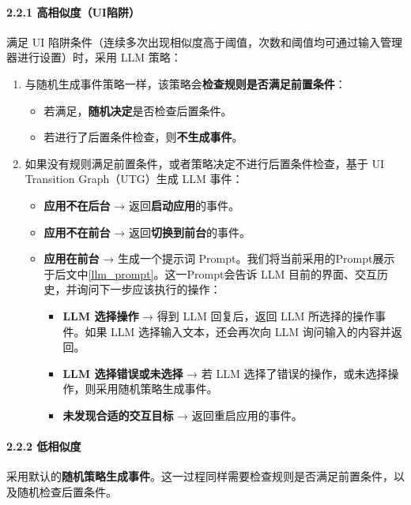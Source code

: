 \documentclass[UTF8, fontset=windows]{article}
\begin{document}
\paragraph{2.2.1 高相似度（UI陷阱）}
满足 UI 陷阱条件（连续多次出现相似度高于阈值，次数和阈值均可通过输入管理器进行设置）时，采用 LLM 策略：
\begin{enumerate}[leftmargin=2em]
    \item 与随机生成事件策略一样，该策略会\textbf{检查规则是否满足前置条件}：
    \begin{itemize}
        \item 若满足，\textbf{随机决定}是否检查后置条件。
        \item 若进行了后置条件检查，则\textbf{不生成事件}。
    \end{itemize}
    \item 如果没有规则满足前置条件，或者策略决定不进行后置条件检查，基于 UI Transition Graph（UTG）生成 LLM 事件：
    \begin{itemize}
        \item \textbf{应用不在后台} → 返回\textbf{启动应用}的事件。
        \item \textbf{应用不在前台} → 返回\textbf{切换到前台}的事件。
        \item \textbf{应用在前台} → 生成一个提示词 Prompt。我们将当前采用的Prompt展示于后文中\ref{llm_prompt}。这一Prompt会告诉 LLM 目前的界面、交互历史，并询问下一步应该执行的操作：
        \begin{itemize}
            \item \textbf{LLM 选择操作} → 得到 LLM 回复后，返回 LLM 所选择的操作事件。如果 LLM 选择输入文本，还会再次向 LLM 询问输入的内容并返回。
            \item \textbf{LLM 选择错误或未选择} → 若 LLM 选择了错误的操作，或未选择操作，则采用随机策略生成事件。
            \item \textbf{未发现合适的交互目标} → 返回重启应用的事件。
        \end{itemize}
    \end{itemize}
\end{enumerate}

\paragraph{2.2.2 低相似度}
采用默认的\textbf{随机策略生成事件}。这一过程同样需要检查规则是否满足前置条件，以及随机检查后置条件。
\end{document}
